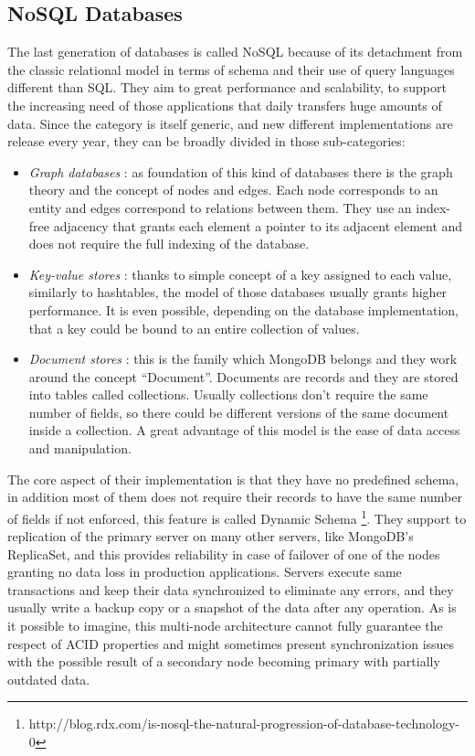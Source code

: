 \subsection{NoSQL Databases}
The last generation of databases is called NoSQL because of its detachment from the classic relational model in terms of schema and their use of query languages different  than SQL.
They  aim to great performance and scalability, to support the increasing need of those applications that daily transfers huge amounts of data.
Since the category is itself generic, and new different implementations are release every year, they can be broadly divided in those sub-categories:
\begin{itemize}
	\item \textit{Graph databases} : as foundation of this kind of databases there is the graph theory and the concept of nodes and edges. Each node corresponds to an entity and edges correspond to relations between them. They use an index-free adjacency that grants each element a pointer to its adjacent element and does not require the full indexing of the database.
	\item \textit{Key-value stores} : thanks to simple concept of a key assigned to each value, similarly to hashtables, the model of those databases usually grants higher performance. It is even possible, depending on the database implementation, that a key could be bound to an entire collection of values.
	\item \textit{Document stores} : this is the family which MongoDB belongs and they work around the concept “Document”. Documents are records and they are stored into tables called collections. Usually collections don’t require the same number of fields, so there could be different versions of the same document inside a collection. A great advantage of this model is the ease of data access and manipulation.
\end{itemize}
The core aspect of their implementation is that they have no predefined schema, in addition most of them does not require their records to have the same number of fields if not enforced,  this feature is called Dynamic Schema \footnote{http://blog.rdx.com/is-nosql-the-natural-progression-of-database-technology-0}.
They support to replication of the primary server on many other servers, like MongoDB’s ReplicaSet, and this provides reliability in case of failover of one of the nodes granting no data loss in production applications. Servers execute same transactions and keep their data synchronized to eliminate any errors, and they usually write a backup copy or a snapshot of the data after any operation. As is it possible to imagine, this multi-node architecture cannot fully guarantee the respect of ACID properties and might sometimes present synchronization issues with the possible result of a secondary node becoming primary with partially outdated data.
